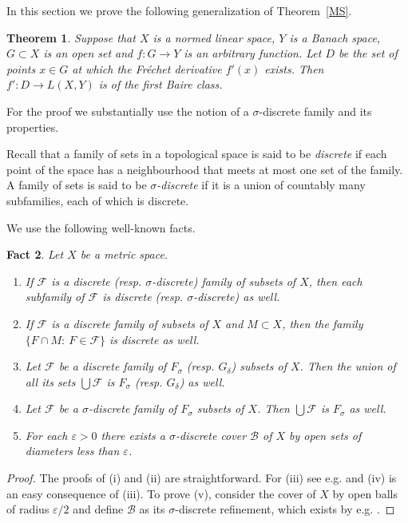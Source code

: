 \documentclass[12pt,a4paper]{amsart}
\theoremstyle{plain}
\newtheorem{theorem}{Theorem}[section]   %
\newtheorem{fact}[theorem]{Fact}
\theoremstyle{definition}
\theoremstyle{remark}
\numberwithin{equation}{section}
\newcommand{\ep}{\varepsilon}
\newcommand{\B}{{\mathcal{B}}}
\newcommand{\F}{{\mathcal{F}}}
\begin{document}
In this section we  prove the following generalization of Theorem~\ref{MS}.


\begin{theorem}\label{main}
Suppose that  $X$  is a normed linear space, $Y$ is a Banach  space, $G\subset X$ is an 
open set and $f:G \to Y$ is an arbitrary function. Let  $D$  be  
the set of points $x\in G$ at which the Fr\'echet derivative $f'(x)$ exists.  Then    $f':D\to L(X,Y)$ is of the  first Baire class.
\end{theorem}

For the proof we substantially use the notion of a $\sigma$-discrete family  and its properties.

Recall that a 
  family of sets in a topological space is said to be {\em discrete} if each
point of the space has a neighbourhood that meets at most one set of the family.
A family of sets is said to be {\em $\sigma$-discrete} if it is a union of countably
many subfamilies, each of which is discrete.

We  use the following well-known facts.


\begin{fact}\label{discr}
Let $X$ be a metric  space. 
\begin{enumerate}
\item [(i)]
If $\F$ is a  discrete (resp. $\sigma$-discrete) family of subsets of $X$, then each subfamily of $\F$
 is  discrete (resp. $\sigma$-discrete) as well.
\item [(ii)]
If $\F$ is a  discrete  family of subsets of $X$ and $M\subset X$, then the family 
 $\{F \cap M:\ F \in \F\}$ is discrete as well.
\item [(iii)]
Let $\F$ be a discrete family of $F_{\sigma}$ (resp. $ G_{\delta}$) subsets of $X$. Then
 the union of all its sets $\bigcup \F$ is $F_{\sigma}$ (resp. $ G_{\delta}$) as well.
\item [(iv)]
Let $\F$ be a $\sigma$-discrete family of $F_{\sigma}$  subsets of $X$. Then
   $\bigcup \F$ is $F_{\sigma}$ as well.
\item[(v)]
For each $\ep>0$ there exists a $\sigma$-discrete cover $\B$ of $X$ by open sets of diameters less than $\ep$.	
\end{enumerate}
\end{fact}
\begin{proof}
The proofs of  (i) and (ii) are  straightforward. For (iii) see e.g.  \cite[p. 148]{Ha} and (iv) is an easy consequence of (iii).
To prove (v), consider the  cover of $X$ by open balls of radius $\ep/2$ and define $\B$ as
 its  $\sigma$-discrete refinement, 
 which exists by e.g. \cite[p. 234]{K}.
\end{proof}
\end{document}
